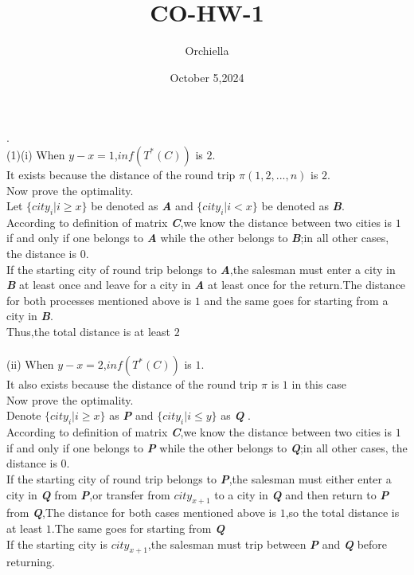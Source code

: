 \documentclass{article}
\title{CO-HW-1}
\author{Orchiella}
\date{October 5,2024}
\begin{document}
.\\
(1)(i) When $y-x=1$,$ inf(T^*(C)) $ is $2$.\\
It exists because the distance of the round trip $ \pi (1,2,...,n) $ is $2$.\\
Now prove the optimality.\\
Let $\{city_i | i \geq x\}$ be denoted as \textbf{\textit{A}} and $\{city_i | i < x\}$ be denoted as \textbf{\textit{B}}.\\
According to definition of matrix \textit{\textbf{C}},we know the distance between two cities is $1$ if and only if one belongs to \textit{\textbf{A}} while the other belongs to \textbf{\textit{B}};in all other cases, the distance is $0$.\\
If the starting city of round trip belongs to \textbf{\textit{A}},the salesman must enter a city in \textbf{\textit{B}} at least once and leave for a city in \textbf{\textit{A}} at least once for the return.The distance for both processes mentioned above is $1$ and the same goes for starting from a city in \textbf{\textit{B}}.\\
Thus,the total distance is at least $2$\\
\\
(ii) When $y-x = 2$,$inf(T^*(C))$ is $1$.\\
It also exists because the distance of the round trip $\pi$ is $1$ in this case\\
Now prove the optimality.\\
Denote $\{city_i | i \geq x\}$ as \textbf{\textit{P}} and $\{city_i | i \leq y\}$ as \textbf{\textit{Q}} .\\
According to definition of matrix \textit{\textbf{C}},we know the distance between two cities is $1$ if and only if one belongs to \textit{\textbf{P}} while the other belongs to \textbf{\textit{Q}};in all other cases, the distance is $0$.\\
If the starting city of round trip belongs to \textbf{\textit{P}},the salesman must either enter a city in \textit{\textbf{Q}} from \textit{\textbf{P}},or transfer from $city_{x+1}$ to a city in \textbf{\textit{Q}} and then return to \textbf{\textit{P}} from \textbf{\textit{Q}},The distance for both cases mentioned above is $1$,so the total distance is at least $1$.The same goes for starting from \textbf{\textit{Q}}\\
If the starting city is $city_{x+1}$,the salesman must trip between \textit{\textbf{P}} and \textbf{\textit{Q}} before returning.\\
\end{document}

